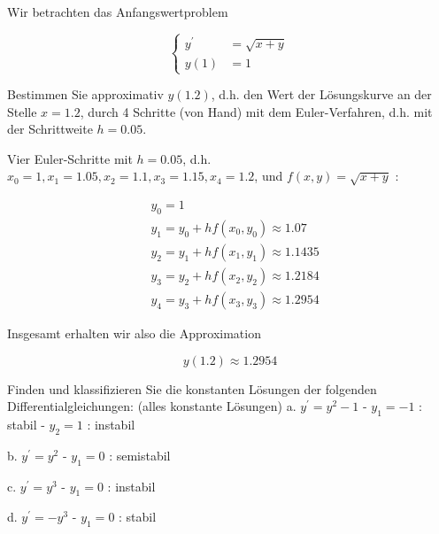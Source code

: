 \begin{example}
    Wir betrachten das Anfangswertproblem

    $$
    \left\{\begin{aligned}
    y^{\prime} & =\sqrt{x+y} \\
    y(1) & =1
    \end{aligned}\right.
    $$
    
    Bestimmen Sie approximativ $y(1.2)$, d.h. den Wert der Lösungskurve an der Stelle $x=1.2$, durch 4 Schritte (von Hand) mit dem Euler-Verfahren, d.h. mit der Schrittweite $h=0.05$.

\tcblower
Vier Euler-Schritte mit $h=0.05$, d.h. $x_{0}=1, x_{1}=1.05, x_{2}=1.1, x_{3}=1.15, x_{4}=1.2$, und $f(x, y)=\sqrt{x+y}$ :

$$
\begin{aligned}
& y_{0}=1 \\
& y_{1}=y_{0}+h f\left(x_{0}, y_{0}\right) \approx 1.07 \\
& y_{2}=y_{1}+h f\left(x_{1}, y_{1}\right) \approx 1.1435 \\
& y_{3}=y_{2}+h f\left(x_{2}, y_{2}\right) \approx 1.2184 \\
& y_{4}=y_{3}+h f\left(x_{3}, y_{3}\right) \approx 1.2954
\end{aligned}
$$

Insgesamt erhalten wir also die Approximation

$$
y(1.2) \approx 1.2954
$$
\end{example}


\begin{example}
    Finden und klassifizieren Sie die konstanten Lösungen der folgenden Differentialgleichungen: (alles konstante Lösungen)
a. $y^{\prime}=y^{2}-1$
- $y_{1}=-1$ : stabil
- $y_{2}=1$ : instabil

b. $y^{\prime}=y^{2}$
- $y_{1}=0$ : semistabil

c. $y^{\prime}=y^{3}$
- $y_{1}=0$ : instabil

d. $y^{\prime}=-y^{3}$
- $y_{1}=0$ : stabil

\end{example}



